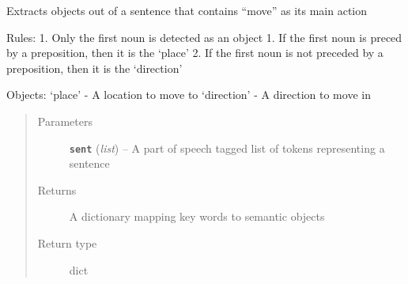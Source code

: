 \documentclass[letterpaper,10pt,english]{sphinxmanual}
\begin{document}

\begin{fulllineitems}
\label{extractor:interpreter.extractor.object_dict_move}
Extracts objects out of a sentence that contains ``move'' as its main action

Rules:
1. Only the first noun is detected as an object
1. If the first noun is preced by a preposition, then it is the `place'
2. If the first noun is not preceded by a preposition, then it is the `direction'

Objects:
`place' - A location to move to
`direction' - A direction to move in
\begin{quote}\begin{description}
\item[{Parameters}] \leavevmode
\textbf{\texttt{sent}} (\emph{list}) -- A part of speech tagged list of tokens representing a sentence

\item[{Returns}] \leavevmode
A dictionary mapping key words to semantic objects

\item[{Return type}] \leavevmode
dict

\end{description}\end{quote}

\end{fulllineitems}

\end{document}
